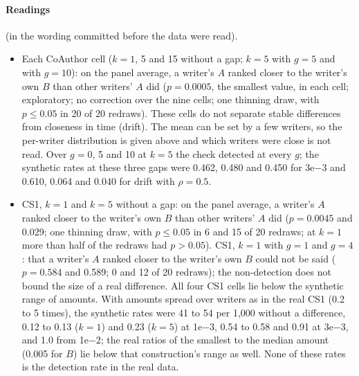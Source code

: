 \documentclass[10pt]{article}
\newcommand{\e}[2]{#1e$#2$}
\begin{document}
\paragraph{Readings} (in the wording committed before the data were read).
\begin{itemize}
\item Each CoAuthor cell ($k=1$, 5 and 15 without a gap; $k=5$ with $g=5$ and with $g=10$): on the panel average, a writer's $A$ ranked closer to the writer's own $B$ than other writers' $A$ did ($p=0.0005$, the smallest value, in each cell; exploratory; no correction over the nine cells; one thinning draw, with $p\le0.05$ in 20 of 20 redraws). These cells do not separate stable differences from closeness in time (drift). The mean can be set by a few writers, so the per-writer distribution is given above and which writers were close is not read. Over $g=0$, 5 and 10 at $k=5$ the check detected at every $g$; the synthetic rates at these three gaps were 0.462, 0.480 and 0.450 for \e{3}{-3} and 0.610, 0.064 and 0.040 for drift with $\rho=0.5$.
\item CS1, $k=1$ and $k=5$ without a gap: on the panel average, a writer's $A$ ranked closer to the writer's own $B$ than other writers' $A$ did ($p=0.0045$ and 0.029; one thinning draw, with $p\le0.05$ in 6 and 15 of 20 redraws; at $k=1$ more than half of the redraws had $p>0.05$). CS1, $k=1$ with $g=1$ and $g=4$: that a writer's $A$ ranked closer to the writer's own $B$ could not be said ($p=0.584$ and 0.589; 0 and 12 of 20 redraws); the non-detection does not bound the size of a real difference. All four CS1 cells lie below the synthetic range of amounts. With amounts spread over writers as in the real CS1 (0.2 to 5 times), the synthetic rates were 41 to 54 per 1,000 without a difference, 0.12 to 0.13 ($k=1$) and 0.23 ($k=5$) at \e{1}{-3}, 0.54 to 0.58 and 0.91 at \e{3}{-3}, and 1.0 from \e{1}{-2}; the real ratios of the smallest to the median amount (0.005 for $B$) lie below that construction's range as well. None of these rates is the detection rate in the real data.

\end{itemize}
\end{document}

